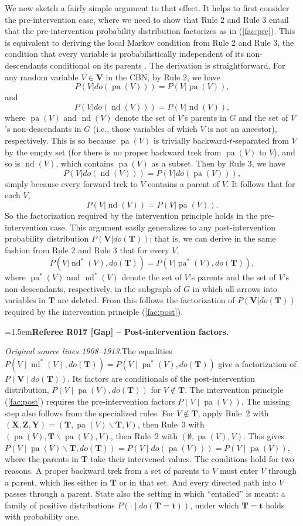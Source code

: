 \documentclass[12pt]{amsart}
\newcommand{\RefereeRemark}[4]{%
  \par\medskip\begingroup\normalfont\small\color{RefereePurple}%
  \emergencystretch=1.5em\noindent\textbf{Referee R#1 [#2] -- #3.}\par\nobreak\noindent #4\par
  \endgroup\medskip
}
\theoremstyle{plain}
\theoremstyle{definition}
\theoremstyle{remark}
\numberwithin{equation}{section}
\theoremstyle{plain}
\newcommand{\0}{\emptyset}
\newcommand{\mi}{\smallsetminus}
\DeclareMathOperator{\pa}{pa}
\DeclareMathOperator{\nd}{nd}
\begin{document}
We now sketch a fairly simple argument to that effect. It helps to first consider the pre-intervention case, where we need to show that Rule 2 and Rule 3 entail that the pre-intervention probability distribution factorizes as in (\ref{fac:pre}). This is equivalent to deriving the local Markov condition from Rule 2 and Rule 3, the condition that every variable is probabilistically independent of its non-descendants conditional on its parents \cite{SGS2000}. The derivation is straightforward. For any random variable $V\in \mathbf{V}$ in the CBN, by Rule 2, we have
\[
P(V | do(\pa(V))) = P(V | \pa(V)),
\]
and
\[
P(V | do(\nd(V))) = P(V | \nd(V)),
\]
where $\pa(V)$ and $\nd(V)$ denote the set of $V$'s parents in $G$ and the set of $V$'s non-descendants in $G$ (i.e., those variables of which $V$ is not an ancestor), respectively. This is so because $\pa(V)$ is trivially backward-$t$-separated from $V$ by the empty set (for there is no proper backward trek from $\pa(V) $ to $V$), and so is $\nd(V)$, which contains $\pa(V)$ as a subset. Then by Rule 3, we have
\[
P(V | do(\nd(V))) = P(V | do(\pa(V))),
\]
simply because every forward trek to $V$ contains a parent of $V$. It follows that for each $V$, \[
P(V | \nd(V)) = P(V | \pa(V)).
\]
So the factorization required by the intervention principle holds in the pre-intervention case. This argument easily generalizes to any post-intervention probability distribution $P(\mathbf{V}|do(\mathbf{T}))$; that is, we can derive in the same fashion from Rule 2 and Rule 3 that for every $V$,
\[
P(V | \nd^*(V), do(\mathbf{T})) = P(V | \pa^*(V), do(\mathbf{T})),
\]
where $\pa^*(V)$ and $\nd^*(V)$ denote the set of $V$'s parents and the set of $V$'s non-descendants, respectively, in the subgraph of $G$ in which all arrows into variables in $\mathbf{T}$ are deleted.
From this follows the factorization of $P(\mathbf{V}|do(\mathbf{T}))$ required by the intervention principle (\ref{fac:post}).
\hypertarget{review-017}{}\RefereeRemark{017}{Gap}{Post-intervention factors}{%
\textit{Original source lines 1908--1913.}\quad The equalities $P(V \mid \nd^*(V), do(\mathbf{T})) = P(V \mid \pa^*(V), do(\mathbf{T}))$ give a factorization of $P(\mathbf{V} \mid do(\mathbf{T}))$. Its factors are conditionals of the post-intervention distribution, $P(V \mid \pa(V), do(\mathbf{T}))$ for $V \notin \mathbf{T}$. The intervention principle (\ref{fac:post}) requires the pre-intervention factors $P(V \mid \pa(V))$. The missing step also follows from the specialized rules. For $V \notin \mathbf{T}$, apply Rule~2 with $(\mathbf X, \mathbf Z, \mathbf Y) = (\mathbf{T}, \pa(V) \mi \mathbf{T}, V)$, then Rule~3 with $(\pa(V), \mathbf{T} \mi \pa(V), V)$, then Rule~2 with $(\0, \pa(V), V)$. This gives $P(V \mid \pa(V) \mi \mathbf{T}, do(\mathbf{T})) = P(V \mid do(\pa(V))) = P(V \mid \pa(V))$, where the parents in $\mathbf{T}$ take their intervened values. The conditions hold for two reasons. A proper backward trek from a set of parents to $V$ must enter $V$ through a parent, which lies either in $\mathbf{T}$ or in that set. And every directed path into $V$ passes through a parent. State also the setting in which ``entailed'' is meant: a family of positive distributions $P(\cdot \mid do(\mathbf{T} = \mathbf{t}))$, under which $\mathbf{T} = \mathbf{t}$ holds with probability one.
}
\end{document}
